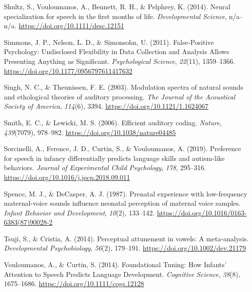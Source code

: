 \documentclass[man]{apa6}
\begin{document}
\leavevmode\hypertarget{ref-shultz_neural_2014}{}%
Shultz, S., Vouloumanos, A., Bennett, R. H., \& Pelphrey, K. (2014). Neural specialization for speech in the first months of life. \emph{Developmental Science}, n/a--n/a. \url{https://doi.org/10.1111/desc.12151}

\leavevmode\hypertarget{ref-simmons_false-positive_2011}{}%
Simmons, J. P., Nelson, L. D., \& Simonsohn, U. (2011). False-Positive Psychology: Undisclosed Flexibility in Data Collection and Analysis Allows Presenting Anything as Significant. \emph{Psychological Science}, \emph{22}(11), 1359--1366. \url{https://doi.org/10.1177/0956797611417632}

\leavevmode\hypertarget{ref-singh_modulation_2003}{}%
Singh, N. C., \& Theunissen, F. E. (2003). Modulation spectra of natural sounds and ethological theories of auditory processing. \emph{The Journal of the Acoustical Society of America}, \emph{114}(6), 3394. \url{https://doi.org/10.1121/1.1624067}

\leavevmode\hypertarget{ref-smith_efficient_2006}{}%
Smith, E. C., \& Lewicki, M. S. (2006). Efficient auditory coding. \emph{Nature}, \emph{439}(7079), 978--982. \url{https://doi.org/10.1038/nature04485}

\leavevmode\hypertarget{ref-sorcinelli_preference_2019}{}%
Sorcinelli, A., Ference, J. D., Curtin, S., \& Vouloumanos, A. (2019). Preference for speech in infancy differentially predicts language skills and autism-like behaviors. \emph{Journal of Experimental Child Psychology}, \emph{178}, 295--316. \url{https://doi.org/10.1016/j.jecp.2018.09.011}

\leavevmode\hypertarget{ref-spence_prenatal_1987}{}%
Spence, M. J., \& DeCasper, A. J. (1987). Prenatal experience with low-frequency maternal-voice sounds influence neonatal perception of maternal voice samples. \emph{Infant Behavior and Development}, \emph{10}(2), 133--142. \url{https://doi.org/10.1016/0163-6383(87)90028-2}

\leavevmode\hypertarget{ref-tsuji_perceptual_2014}{}%
Tsuji, S., \& Cristia, A. (2014). Perceptual attunement in vowels: A meta-analysis. \emph{Developmental Psychobiology}, \emph{56}(2), 179--191. \url{https://doi.org/10.1002/dev.21179}

\leavevmode\hypertarget{ref-vouloumanos_foundational_2014}{}%
Vouloumanos, A., \& Curtin, S. (2014). Foundational Tuning: How Infants' Attention to Speech Predicts Language Development. \emph{Cognitive Science}, \emph{38}(8), 1675--1686. \url{https://doi.org/10.1111/cogs.12128}
\end{document}
